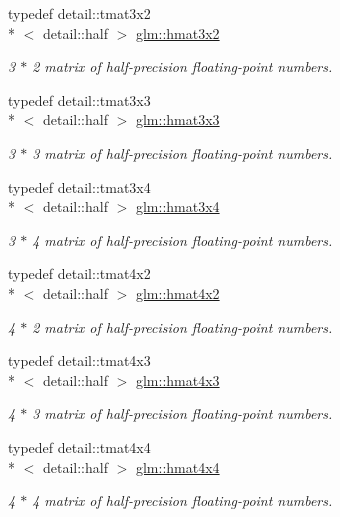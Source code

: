 \begin{DoxyCompactItemize}
typedef detail\-::tmat3x2\\*
$<$ detail\-::half $>$ \hyperlink{group__gtc__half__float_ga70ae0376caa86bce1c8df390c7211321}{glm\-::hmat3x2}
\begin{DoxyCompactList}\small\item\em 3 $\ast$ 2 matrix of half-\/precision floating-\/point numbers. \end{DoxyCompactList}\item 
typedef detail\-::tmat3x3\\*
$<$ detail\-::half $>$ \hyperlink{group__gtc__half__float_ga074b3f26b6be3af8ac817a2c4eba8434}{glm\-::hmat3x3}
\begin{DoxyCompactList}\small\item\em 3 $\ast$ 3 matrix of half-\/precision floating-\/point numbers. \end{DoxyCompactList}\item 
typedef detail\-::tmat3x4\\*
$<$ detail\-::half $>$ \hyperlink{group__gtc__half__float_gabde8c0dd3585490525f0d2b2da25e24a}{glm\-::hmat3x4}
\begin{DoxyCompactList}\small\item\em 3 $\ast$ 4 matrix of half-\/precision floating-\/point numbers. \end{DoxyCompactList}\item 
typedef detail\-::tmat4x2\\*
$<$ detail\-::half $>$ \hyperlink{group__gtc__half__float_gadaf0a1837917e1b87a5269b379f90e33}{glm\-::hmat4x2}
\begin{DoxyCompactList}\small\item\em 4 $\ast$ 2 matrix of half-\/precision floating-\/point numbers. \end{DoxyCompactList}\item 
typedef detail\-::tmat4x3\\*
$<$ detail\-::half $>$ \hyperlink{group__gtc__half__float_ga44cb3a8fb375a76fc6ccb2f0add2bcf2}{glm\-::hmat4x3}
\begin{DoxyCompactList}\small\item\em 4 $\ast$ 3 matrix of half-\/precision floating-\/point numbers. \end{DoxyCompactList}\item 
typedef detail\-::tmat4x4\\*
$<$ detail\-::half $>$ \hyperlink{group__gtc__half__float_gabf1d2a56f968368a22222ab03fedf67f}{glm\-::hmat4x4}
\begin{DoxyCompactList}\small\item\em 4 $\ast$ 4 matrix of half-\/precision floating-\/point numbers. \end{DoxyCompactList}\end{DoxyCompactItemize}
